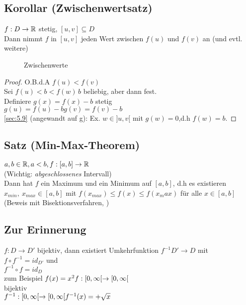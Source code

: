 \subsection{Korollar (Zwischenwertsatz)}\label{sec:5.10}
$f: D \rightarrow \mathbb{R} $ stetig, $[u,v] \subseteq D$\\
Dann nimmt $f$ in $[u,v]$ jeden Wert zwischen $f(u)$ und $f(v)$ an (und evtl. weitere)
\begin{figure}[h!]
	\centering
	\caption{Zwischenwerte}
\end{figure}
\begin{proof}
O.B.d.A $f(u) < f(v)$\\
Sei $f(u) < b < f(w)\, b$ beliebig, aber dann fest.\\
Definiere $g(x) = f(x) -b $ stetig\\
$g(u) = f(u) -b
g(v) = f(v) -b$\\
\ref{sec:5.9} (angewandt auf g): Ex. $w \in ]u,v[$ mit $g(w) = 0$,d.h $f(w) =b$.
\end{proof}
\subsection{Satz (Min-Max-Theorem)}\label{sec:5.11}
$a,b \in \mathbb{R} , a < b, f : [a,b] \to \mathbb{R}$\\
(Wichtig: \emph{abgeschlossenes} Intervall)\\
Dann hat $f$ ein Maximum und ein Minimum auf $[a,b]$, d.h es existieren\\ $x_{min},\ x_{max} \in [a,b]$ mit $f(x_{max}) \leq f(x) \leq f(x_max)$ für alle $x \in [a,b]$ (Beweis mit Bisektionsverfahren, \cite{k4})
\subsection*{Zur Erinnerung}
$f: D \to D'$ bijektiv, dann existiert Umkehrfunktion $f^{-1} D' \to D$ mit \\
$f \circ f^{-1} = id_{D'}$ und \\
$f^{-1} \circ f = id_D$\\
zum Beispiel $f(x) = x^2\\
f :[0,\infty[ \to [0,\infty[$\\
bijektiv\\
$f^{-1} :[0,\infty[ \to [0,\infty[\\
f^{-1}(x) = +\sqrt{x}$
